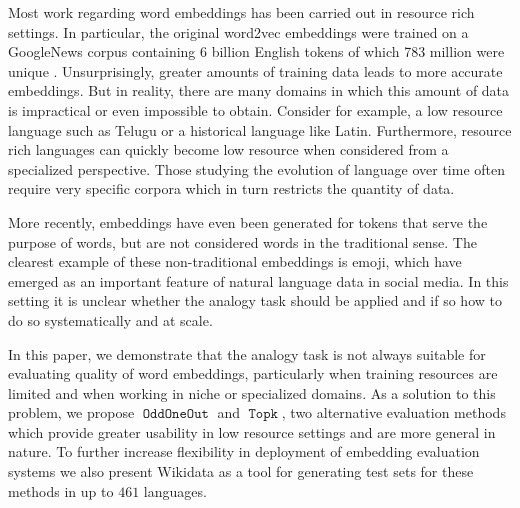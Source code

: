\documentclass[11pt,a4paper]{article}
\DeclareMathOperator{\OddOneOut}{\texttt{OddOneOut}}
\DeclareMathOperator{\topk}{\texttt{Topk}}
\begin{document}
Most work regarding word embeddings has been carried out in resource rich settings. 
In particular, the original word2vec embeddings were trained on a GoogleNews corpus containing 6 billion English tokens of which 783 million were unique \cite{mikolov2013efficient}.
 Unsurprisingly, greater amounts of training data leads to more accurate embeddings.
  But in reality, there are many domains in which this amount of data is impractical or even impossible to obtain. 
  Consider for example, a low resource language such as Telugu or a historical language like Latin.
  Furthermore, resource rich languages can quickly become low resource when considered from a specialized perspective.
   Those studying the evolution of language over time often require very specific corpora which in turn restricts the quantity of data. 

More recently, embeddings have even been generated for tokens that serve the purpose of words, but are not considered words in the traditional sense.
 The clearest example of these non-traditional embeddings is emoji, which have emerged as an important feature of natural language data in social media.
  In this setting it is unclear whether the analogy task should be applied and if so how to do so systematically and at scale.

In this paper, we demonstrate that the analogy task is not always suitable for evaluating quality of word embeddings,
 particularly when training resources are limited and when working in niche or specialized domains. 
 As a solution to this problem, we propose $\OddOneOut$ and $\topk$, two alternative evaluation methods which provide greater usability in low resource settings and are more general in nature.
  To further increase flexibility in deployment of embedding evaluation systems we also present Wikidata as a tool for generating test sets for these methods in up to $461$ languages. 


\end{document}
